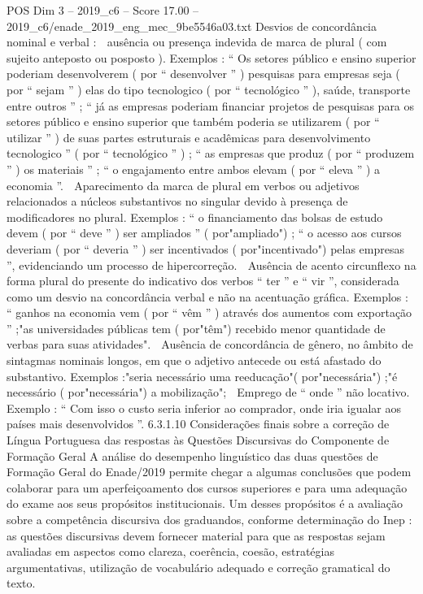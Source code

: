 \begin{textsample}{POS Dim 3 – 2019\_c6 – Score 17.00 – 2019\_c6/enade\_2019\_eng\_mec\_9be5546a03.txt}
Desvios de concordância nominal e verbal :  ausência ou presença indevida de marca de plural ( com sujeito anteposto ou posposto ).
Exemplos : “ Os setores público e ensino superior poderiam desenvolverem ( por “ desenvolver ” ) pesquisas para empresas seja ( por “ sejam ” ) elas do tipo tecnologico ( por “ tecnológico ” ), saúde, transporte entre outros ” ; “ já as empresas poderiam financiar projetos de pesquisas para os setores público e ensino superior que também poderia se utilizarem ( por “ utilizar ” ) de suas partes estruturais e acadêmicas para desenvolvimento tecnologico ” ( por “ tecnológico ” ) ; “ as empresas que produz ( por “ produzem ” ) os materiais ” ; “ o engajamento entre ambos elevam ( por “ eleva ” ) a economia ”.  Aparecimento da marca de plural em verbos ou adjetivos relacionados a núcleos substantivos no singular devido à presença de modificadores no plural.
Exemplos : “ o financiamento das bolsas de estudo devem ( por “ deve ” ) ser ampliados ” ( por"ampliado") ; “ o acesso aos cursos deveriam ( por “ deveria ” ) ser incentivados ( por"incentivado") pelas empresas ”, evidenciando um processo de hipercorreção.  Ausência de acento circunflexo na forma plural do presente do indicativo dos verbos “ ter ” e “ vir ”, considerada como um desvio na concordância verbal e não na acentuação gráfica.
Exemplos : “ ganhos na economia vem ( por “ vêm ” ) através dos aumentos com exportação ” ;"as universidades públicas tem ( por"têm") recebido menor quantidade de verbas para suas atividades".  Ausência de concordância de gênero, no âmbito de sintagmas nominais longos, em que o adjetivo antecede ou está afastado do substantivo.
Exemplos :"seria necessário uma reeducação"( por"necessária") ;"é necessário ( por"necessária") a mobilização";  Emprego de “ onde ” não locativo.
Exemplo : “ Com isso o custo seria inferior ao comprador, onde iria igualar aos países mais desenvolvidos ”. 6.3.1.10 Considerações finais sobre a correção de Língua Portuguesa das respostas às Questões Discursivas do Componente de Formação Geral A análise do desempenho linguístico das duas questões de Formação Geral do Enade/2019 permite chegar a algumas conclusões que podem colaborar para um aperfeiçoamento dos cursos superiores e para uma adequação do exame aos seus propósitos institucionais.
Um desses propósitos é a avaliação sobre a competência discursiva dos graduandos, conforme determinação do Inep : as questões discursivas devem fornecer material para que as respostas sejam avaliadas em aspectos como clareza, coerência, coesão, estratégias argumentativas, utilização de vocabulário adequado e correção gramatical do texto.

\end{textsample}
